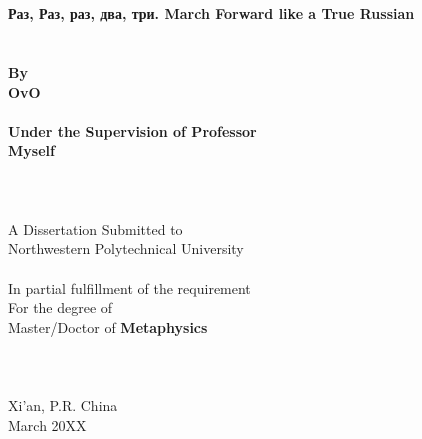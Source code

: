 \begin{titlepage}
	\fTNR
	\begin{spacing}{1.2}
		\begin{center}
			\renewcommand{\baselinestretch}{1.2}
			\renewcommand{\captionfont}{\linespread{1.2}\normalsize}
			\setmainfont{\defaultEngFont}
			\sSanhao ~ \\
			\sSanhao ~ \\
			\fTNR \sErhao \textbf{Раз, Раз, раз, два, три. March Forward like a True Russian}
			\fSong \sXiaoer ~ \\
			\fSong \sXiaoer ~ \\
			\fSong \sXiaoer ~ \\
			\fTNR \sXiaosan \textbf{By}\\
			\fTNR \sXiaosan \textbf{OvO}\\
			\fSong \sXiaosan ~ \\
			\fTNR \sXiaosan \textbf{Under the Supervision of Professor}\\
			\fTNR \sXiaosan \textbf{Myself}
			\fSong \sSanhao ~ \\
			\fSong \sSanhao ~ \\
			\fSong \sSanhao ~ \\
			\fSong \sSanhao ~ \\
			\fTNR \sXiaosan A Dissertation Submitted to\\
			\fTNR \sXiaosan Northwestern Polytechnical University \\
			\fSong \sSanhao ~ \\
			\fTNR In partial fulfillment of the requirement \\
			\fTNR For the degree of \\
			\fTNR Master/Doctor of \textbf{Metaphysics}
			\fSong \sXiaosan ~ \\
			\fSong \sXiaosan ~ \\
			\fSong \sXiaosan ~ \\
			\fSong \sXiaosan ~ \\
			\fTNR \sXiaosan Xi'an, P.R. China \\
			\fTNR \sXiaosan March 20XX
		\end{center}
	\end{spacing}

\end{titlepage}
\fSong \normalsize

\endinput